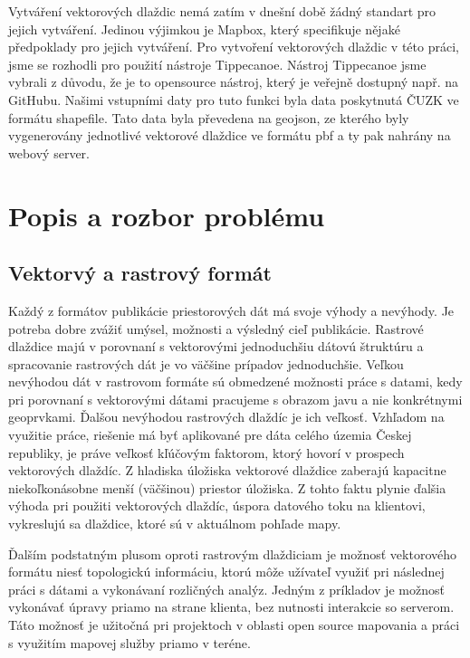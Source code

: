 \documentclass[12pt]{article}
\begin{document}
Vytváření vektorových dlaždic nemá zatím v dnešní době žádný standart pro jejich vytváření. Jedinou výjimkou je Mapbox, který specifikuje nějaké předpoklady pro jejich vytváření. Pro vytvoření vektorových dlaždic v této práci, jsme se rozhodli pro použití nástroje Tippecanoe.
Nástroj Tippecanoe jsme vybrali z důvodu, že je to opensource nástroj, který je veřejně dostupný např. na GitHubu. Našimi vstupními daty pro tuto funkci byla data poskytnutá ČUZK ve formátu shapefile. Tato data byla převedena na geojson, ze kterého byly vygenerovány jednotlivé vektorové dlaždice ve formátu pbf a ty pak nahrány na webový server.



\clearpage 
\section{Popis a rozbor problému}

\subsection{Vektorvý a rastrový formát}
Každý z formátov publikácie priestorových dát má svoje výhody a nevýhody. Je potreba dobre zvážiť umýsel, možnosti a výsledný cieľ publikácie. Rastrové dlaždice majú v porovnaní s vektorovými jednoduchšiu dátovú štruktúru a spracovanie rastrových dát je vo väčšine prípadov jednoduchšie. Veľkou nevýhodou dát v rastrovom formáte sú obmedzené možnosti práce s datami, kedy pri porovnaní s vektorovými dátami pracujeme s obrazom javu a nie konkrétnymi geoprvkami. Ďalšou nevýhodou rastrových dlaždíc je ich veľkosť. Vzhľadom na využitie práce, riešenie má byť aplikované pre dáta celého územia Českej republiky, je práve veľkosť kľúčovým faktorom, ktorý hovorí v prospech vektorových dlaždíc. Z hladiska úložiska vektorové dlaždice zaberajú kapacitne niekoľkonásobne menší (väčšinou) priestor úložiska. Z tohto faktu plynie ďalšia výhoda pri použiti vektorových dlaždíc, úspora datového toku na klientovi, vykreslujú sa dlaždice, ktoré sú v aktuálnom pohľade mapy.

Ďalším podstatným plusom oproti rastrovým dlaždiciam je možnosť vektorového formátu niesť topologickú informáciu, ktorú môže užívateľ využiť pri následnej práci s dátami a vykonávaní rozličných analýz. Jedným z príkladov je možnosť vykonávať úpravy priamo na strane klienta,  bez nutnosti interakcie so serverom. Táto možnosť je užitočná pri projektoch v oblasti open source mapovania a práci s využitím mapovej služby priamo v teréne. 
\end{document}
